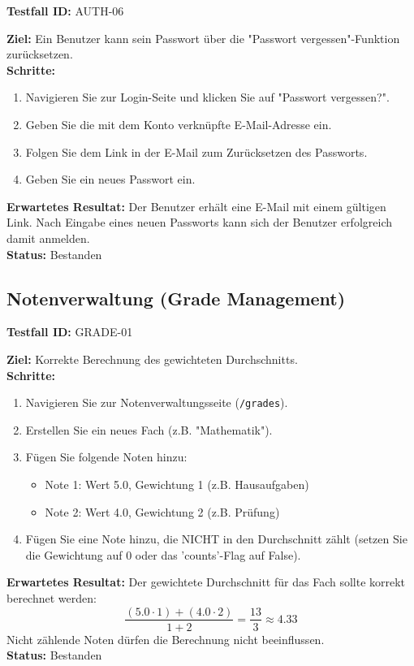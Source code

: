 \documentclass[11pt, a4paper]{article}
\newenvironment{testcase}[1]{%
    \par\vspace{1em}\noindent\begin{minipage}{\linewidth}
    \textbf{Testfall ID:} #1 \\
    \vspace{0.2em}
}{\end{minipage}\par\vspace{1em}}
\begin{document}
\begin{testcase}{AUTH-06}
    \textbf{Ziel:} Ein Benutzer kann sein Passwort über die "Passwort vergessen"-Funktion zurücksetzen.\\
    \textbf{Schritte:}
    \begin{enumerate}[label=\arabic*.]
        \item Navigieren Sie zur Login-Seite und klicken Sie auf "Passwort vergessen?".
        \item Geben Sie die mit dem Konto verknüpfte E-Mail-Adresse ein.
        \item Folgen Sie dem Link in der E-Mail zum Zurücksetzen des Passworts.
        \item Geben Sie ein neues Passwort ein.
    \end{enumerate}
    \textbf{Erwartetes Resultat:} Der Benutzer erhält eine E-Mail mit einem gültigen Link. Nach Eingabe eines neuen Passworts kann sich der Benutzer erfolgreich damit anmelden.\\
    \vspace{0.5em}\textbf{Status:} \textcolor{passcolor}{Bestanden}
\end{testcase}

\subsection{Notenverwaltung (Grade Management)}

\begin{testcase}{GRADE-01}
    \textbf{Ziel:} Korrekte Berechnung des gewichteten Durchschnitts.\\
    \textbf{Schritte:}
    \begin{enumerate}[label=\arabic*.]
        \item Navigieren Sie zur Notenverwaltungsseite (\texttt{/grades}).
        \item Erstellen Sie ein neues Fach (z.B. "Mathematik").
        \item Fügen Sie folgende Noten hinzu:
            \begin{itemize}
                \item Note 1: Wert 5.0, Gewichtung 1 (z.B. Hausaufgaben)
                \item Note 2: Wert 4.0, Gewichtung 2 (z.B. Prüfung)
            \end{itemize}
        \item Fügen Sie eine Note hinzu, die NICHT in den Durchschnitt zählt (setzen Sie die Gewichtung auf 0 oder das 'counts'-Flag auf False).
    \end{enumerate}
    \textbf{Erwartetes Resultat:} Der gewichtete Durchschnitt für das Fach sollte korrekt berechnet werden: $$ \frac{(5.0 \cdot 1) + (4.0 \cdot 2)}{1+2} = \frac{13}{3} \approx 4.33 $$ Nicht zählende Noten dürfen die Berechnung nicht beeinflussen.\\
    \vspace{0.5em}\textbf{Status:} \textcolor{passcolor}{Bestanden}
\end{testcase}
\end{document}
